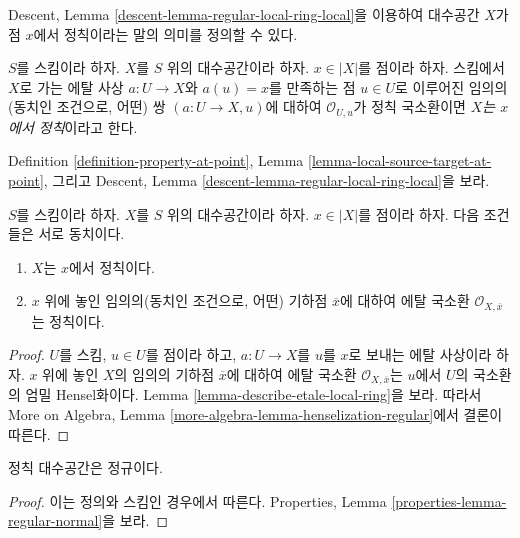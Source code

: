 \noindent
Descent, Lemma \ref{descent-lemma-regular-local-ring-local}을 이용하여
대수공간 $X$가 점 $x$에서 정칙이라는 말의 의미를 정의할 수 있다.

\begin{definition}
\label{definition-regular-at-point}
$S$를 스킴이라 하자. $X$를 $S$ 위의 대수공간이라 하자.
$x \in |X|$를 점이라 하자. 스킴에서 $X$로 가는 에탈 사상
$a : U \to X$와 $a(u) = x$를 만족하는 점 $u \in U$로 이루어진
임의의(동치인 조건으로, 어떤) 쌍 $(a : U \to X, u)$에 대하여
$\mathcal{O}_{U, u}$가 정칙 국소환이면 {\it $X$는 $x$에서 정칙}이라고 한다.
\end{definition}

\noindent
Definition \ref{definition-property-at-point}, Lemma
\ref{lemma-local-source-target-at-point}, 그리고 Descent, Lemma
\ref{descent-lemma-regular-local-ring-local}을 보라.

\begin{lemma}
\label{lemma-regular-at-x}
$S$를 스킴이라 하자. $X$를 $S$ 위의 대수공간이라 하자.
$x \in |X|$를 점이라 하자. 다음 조건들은 서로 동치이다.
\begin{enumerate}
\item $X$는 $x$에서 정칙이다.
\item $x$ 위에 놓인 임의의(동치인 조건으로, 어떤) 기하점
$\overline{x}$에 대하여 에탈 국소환
$\mathcal{O}_{X, \overline{x}}$는 정칙이다.
\end{enumerate}
\end{lemma}

\begin{proof}
$U$를 스킴, $u \in U$를 점이라 하고, $a : U \to X$를 $u$를
$x$로 보내는 에탈 사상이라 하자. $x$ 위에 놓인 $X$의 임의의
기하점 $\overline{x}$에 대하여 에탈 국소환
$\mathcal{O}_{X, \overline{x}}$는 $u$에서 $U$의 국소환의
엄밀 Hensel화이다. Lemma \ref{lemma-describe-etale-local-ring}을 보라.
따라서 More on Algebra, Lemma
\ref{more-algebra-lemma-henselization-regular}에서 결론이 따른다.
\end{proof}

\begin{lemma}
\label{lemma-regular-normal}
정칙 대수공간은 정규이다.
\end{lemma}

\begin{proof}
이는 정의와 스킴인 경우에서 따른다. Properties, Lemma
\ref{properties-lemma-regular-normal}을 보라.
\end{proof}


